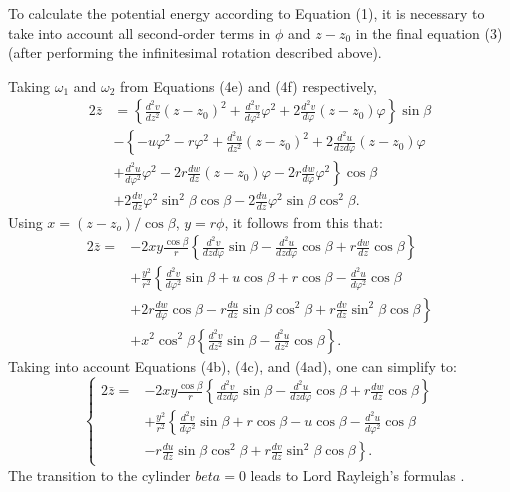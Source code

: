 \documentclass[11pt]{amsart}
\begin{document}
To calculate the potential energy according to Equation (1), it is necessary to take
into account all second-order terms in $\phi$ and $z - z_0$ in the final equation
(3) (after performing the infinitesimal rotation described above).

Taking \(\omega_1\) and \(\omega_2\) from Equations (4e) and (4f) respectively,
\[
\begin{aligned}
2 \bar{z} & =\left\{\frac{d^2 v}{d z^2}\left(z-z_0\right)^2+\frac{d^2 v}{d \varphi^2} \varphi^2+2 \frac{d^2 v}{d \varphi}\left(z-z_0\right) \varphi\right\} \sin \beta \\
& -\left\{-u \varphi^2-r \varphi^2+\frac{d^2 u}{d z^2}\left(z-z_0\right)^2+2 \frac{d^2 u}{d z d \varphi}\left(z-z_0\right) \varphi\right. \\
& \left.+\frac{d^2 u}{d \varphi^2} \varphi^2-2 r \frac{d w}{d z}\left(z-z_0\right) \varphi-2 r \frac{d w}{d \varphi} \varphi^2\right\} \cos \beta \\
& +2 \frac{d v}{d z} \varphi^2 \sin ^2 \beta \cos \beta-2 \frac{d u}{d z} \varphi^2 \sin \beta \cos ^2 \beta .
\end{aligned}
\]
Using \(x = (z-z_o)/ \cos \beta\), \(y = r \phi\), it follows from this that:
\[
\begin{aligned}
2\bar{z}= &-2xy \frac{\cos \beta}{r}\left\{\frac{d^2 v}{d z d \varphi} \sin \beta-\frac{d^2 u}{d z d \varphi} \cos \beta+r \frac{d w}{d z} \cos \beta\right\} \\
& +\frac{y^2}{r^2}\left\{\frac{d^2 v}{d \varphi^2} \sin \beta+u \cos \beta+r \cos \beta-\frac{d^2 u}{d \varphi^2} \cos \beta\right. \\
& \left.+2 r \frac{d w}{d \varphi} \cos \beta-r \frac{d u}{d z} \sin \beta \cos ^2 \beta+r \frac{d v}{d z} \sin ^2 \beta \cos \beta\right\} \\
& +x^2 \cos ^2 \beta\left\{\frac{d^2 v}{d z^2} \sin \beta-\frac{d^2 u}{d z^2} \cos \beta\right\} .
\end{aligned}
\]
Taking into account Equations (4b), (4c), and (4ad), one can simplify to:
\begin{equation}\label{eq6p732}
\left\{\begin{aligned}
2 \bar{z}= & -2 x y \frac{\cos \beta}{r}\left\{\frac{d^2 v}{d z d \varphi} \sin \beta-\frac{d^2 u}{d z d \varphi} \cos \beta+r \frac{d w}{d z} \cos \beta\right\} \\
& +\frac{y^2}{r^2}\left\{\frac{d^2 v}{d \varphi^2} \sin \beta+r \cos \beta-u \cos \beta-\frac{d^2 u}{d \varphi^2} \cos \beta\right. \\
& \left.-r \frac{d u}{d z} \sin \beta \cos ^2 \beta+r \frac{d v}{d z} \sin ^2 \beta \cos \beta\right\} .
\end{aligned}\right.
\end{equation}
The transition to the cylinder \(beta = 0\) leads to
Lord Rayleigh's formulas \cite[p 414 Eq 6]{rayleigh_sound_v1_1945}.
\end{document}
